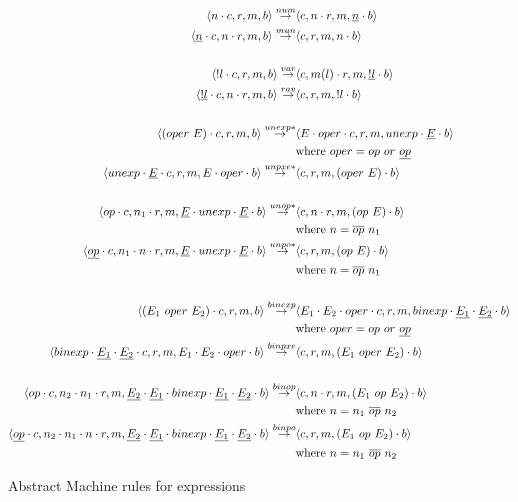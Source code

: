 \begin{figure}[ht]
    \centering
    \footnotesize
    \begin{align*}
    \astate{n}{}{}{} \arule{num}& \astate{}{n}{}{\underline{n}} \\
    \bstate{\underline{n}}{n}{}{} \arule{mun}& \bstate{}{}{}{n} \\
    \\
    \astate{!l}{}{}{} \arule{var}& \astate{}{m(l)}{}{\underline{!l}} \\
    \bstate{\underline{!l}}{n}{}{} \arule{rav}& \bstate{}{}{}{!l} \\
    \\
    \astate{(oper\ E)}{}{}{} \arule{un exp*}& 
    \astate{E \cdot oper}{}{}{unexp \cdot \underline{E}} \\
       &\text{where } oper = op\ or\ \underline{op} \\
    \bstate{unexp \cdot \underline{E}}{}{}{E \cdot oper} 
    \arule{un pxe*}& \bstate{}{}{}{(oper\ E)} \\
    \\
    \astate{op}{n_1}{}{\underline{E} \cdot unexp \cdot \underline{E}} 
    \arule{un op*}& \astate{}{n}{}{(op\ E)} \\
    & \text{where } n = \overline{op}\ n_1 \\
    \bstate{\underline{op}}{n_1 \cdot n}{}{\underline{E} \cdot unexp \cdot \underline{E}} 
    \arule{un po*}& \bstate{}{}{}{(op\ E)} \\
    & \text{where } n = \overline{op}\ n_1 \\
    \\
    \astate{(E_1\ oper\ E_2)}{}{}{} \arule{bin exp}& 
    \astate{E_1 \cdot E_2 \cdot oper}{}{}{binexp \cdot \underline{E_1} \cdot \underline{E_2}} \\
       &\text{where } oper = op\ or\ \underline{op} \\
    \bstate{binexp \cdot \underline{E_1} \cdot \underline{E_2}}{}{}{E_1 \cdot E_2 \cdot oper} 
    \arule{bin pxe}& \bstate{}{}{}{(E_1\ oper\ E_2)} \\
    \\
    \astate{op}{n_2 \cdot n_1}{}{\underline{E_2} \cdot \underline{E_1} \cdot binexp \cdot \underline{E_1} \cdot \underline{E_2}} 
    \arule{bin op}& \astate{}{n}{}{(E_1\ op\ E_2)} \\
    & \text{where } n = n_1\ \overline{op}\ n_2 \\
    \bstate{\underline{op}}{n_2 \cdot n_1 \cdot n}{}{\underline{E_2} \cdot \underline{E_1} \cdot binexp \cdot \underline{E_1} \cdot \underline{E_2}} 
    \arule{bin po}& \bstate{}{}{}{(E_1\ op\ E_2)} \\
    & \text{where } n = n_1\ \overline{op}\ n_2 
    \end{align*}
    \caption{Abstract Machine rules for expressions}
    \label{fig:abstract_machine_expressions}
\end{figure}

